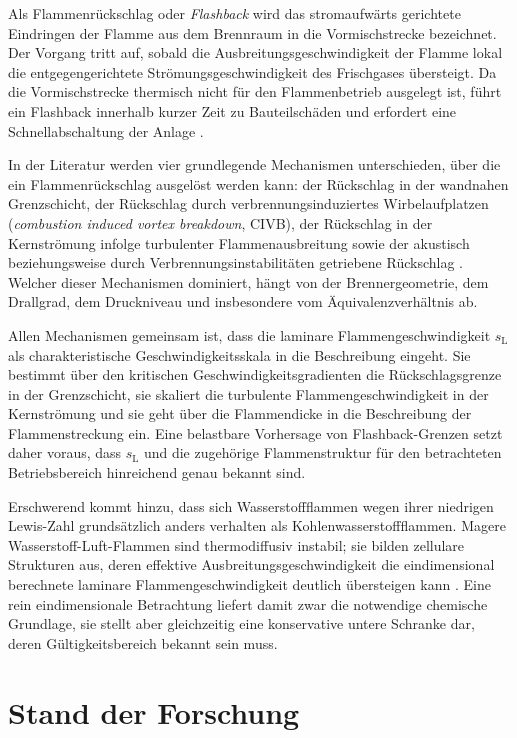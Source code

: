 Als Flammenrückschlag oder \emph{Flashback} wird das stromaufwärts gerichtete
Eindringen der Flamme aus dem Brennraum in die Vormischstrecke bezeichnet. Der
Vorgang tritt auf, sobald die Ausbreitungsgeschwindigkeit der Flamme lokal die
entgegengerichtete Strömungsgeschwindigkeit des Frischgases übersteigt. Da die
Vormischstrecke thermisch nicht für den Flammenbetrieb ausgelegt ist, führt ein
Flashback innerhalb kurzer Zeit zu Bauteilschäden und erfordert eine
Schnellabschaltung der Anlage \cite{Lieuwen_2008, Kalantari_2017}.

In der Literatur werden vier grundlegende Mechanismen unterschieden, über die
ein Flammenrückschlag ausgelöst werden kann: der Rückschlag in der
wandnahen Grenzschicht, der Rückschlag durch verbrennungsinduziertes
Wirbelaufplatzen (\emph{combustion induced vortex breakdown}, CIVB), der
Rückschlag in der Kernströmung infolge turbulenter Flammenausbreitung sowie der
akustisch beziehungsweise durch Verbrennungsinstabilitäten getriebene
Rückschlag \cite{Kalantari_2017, Kroner_2003}. Welcher dieser Mechanismen
dominiert, hängt von der Brennergeometrie, dem Drallgrad, dem Druckniveau und
insbesondere vom Äquivalenzverhältnis ab.

Allen Mechanismen gemeinsam ist, dass die laminare Flammengeschwindigkeit
$s_\mathrm{L}$ als charakteristische Geschwindigkeitsskala in die Beschreibung
eingeht. Sie bestimmt über den kritischen Geschwindigkeitsgradienten die
Rückschlagsgrenze in der Grenzschicht, sie skaliert die turbulente
Flammengeschwindigkeit in der Kernströmung und sie geht über die Flammendicke
in die Beschreibung der Flammenstreckung ein. Eine belastbare Vorhersage von
Flashback-Grenzen setzt daher voraus, dass $s_\mathrm{L}$ und die zugehörige
Flammenstruktur für den betrachteten Betriebsbereich hinreichend genau bekannt
sind.

Erschwerend kommt hinzu, dass sich Wasserstoffflammen wegen ihrer niedrigen
Lewis-Zahl grundsätzlich anders verhalten als Kohlenwasserstoffflammen. Magere
Wasserstoff-Luft-Flammen sind thermodiffusiv instabil; sie bilden zellulare
Strukturen aus, deren effektive Ausbreitungsgeschwindigkeit die eindimensional
berechnete laminare Flammengeschwindigkeit deutlich übersteigen kann
\cite{Matalon_2007, Berger_2022, Frouzakis_2015}. Eine rein eindimensionale
Betrachtung liefert damit zwar die notwendige chemische Grundlage, sie stellt
aber gleichzeitig eine konservative untere Schranke dar, deren Gültigkeitsbereich
bekannt sein muss.

\section{Stand der Forschung}\label{sec:stand_der_forschung}

